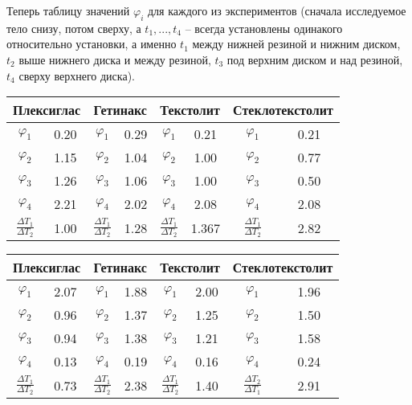 \documentclass[a4paper,11.5pt]{article} %
\begin{document}
Теперь таблицу значений $\varphi_i$ для каждого из экспериментов (сначала исследуемое тело снизу, потом сверху, а $t_1, ... , t_4$ -- всегда установлены одинакого относительно установки, а именно $t_1$ между нижней резиной и нижним диском, $t_2$ выше нижнего диска и между резиной, $t_3$ под верхним диском и над резиной, $t_4$ сверху верхнего диска).

\begin{center}
\begin{tabular}{|c|c|c|c|c|c|c|c|}
\hline 
\multicolumn{2}{|c|}{Плексиглас} & \multicolumn{2}{c|}{Гетинакс} & \multicolumn{2}{c|}{Текстолит} & \multicolumn{2}{c|}{Стеклотекстолит} \\ 
\hline 
$\varphi_1$ & 0.20 & $\varphi_1$ & 0.29 & $\varphi_1$ & 0.21 & $\varphi_1$ & 0.21 \\ 
\hline 
$\varphi_2$ & 1.15 & $\varphi_2$ & 1.04 & $\varphi_2$ & 1.00 & $\varphi_2$ & 0.77 \\ 
\hline 
$\varphi_3$ & 1.26 & $\varphi_3$ & 1.06 & $\varphi_3$ & 1.00 & $\varphi_3$ & 0.50 \\ 
\hline 
$\varphi_4$ & 2.21 & $\varphi_4$ & 2.02 & $\varphi_4$ & 2.08 & $\varphi_4$ & 2.08 \\ 
\hline 
$\frac{\Delta T_1}{\Delta T_2}$ & 1.00 & $\frac{\Delta T_1}{\Delta T_2}$ & 1.28 & $\frac{\Delta T_1}{\Delta T_2}$ & 1.367 & $\frac{\Delta T_1}{\Delta T_2}$ & 2.82 \\
\hline
\end{tabular}
\end{center} 

\begin{center}
\begin{tabular}{|c|c|c|c|c|c|c|c|}
\hline 
\multicolumn{2}{|c|}{Плексиглас} & \multicolumn{2}{c|}{Гетинакс} & \multicolumn{2}{c|}{Текстолит} & \multicolumn{2}{c|}{Стеклотекстолит} \\ 
\hline 
$\varphi_1$ & 2.07 & $\varphi_1$ & 1.88 & $\varphi_1$ & 2.00 & $\varphi_1$ & 1.96 \\ 
\hline 
$\varphi_2$ & 0.96 & $\varphi_2$ & 1.37 & $\varphi_2$ & 1.25 & $\varphi_2$ & 1.50 \\ 
\hline 
$\varphi_3$ & 0.94 & $\varphi_3$ & 1.38 & $\varphi_3$ & 1.21 & $\varphi_3$ & 1.58 \\ 
\hline 
$\varphi_4$ & 0.13 & $\varphi_4$ & 0.19 & $\varphi_4$ & 0.16 & $\varphi_4$ & 0.24 \\ 
\hline 
$\frac{\Delta T_1}{\Delta T_2}$ & 0.73 & $\frac{\Delta T_1}{\Delta T_2}$ & 2.38 & $\frac{\Delta T_1}{\Delta T_2}$ & 1.40 & $\frac{\Delta T_2}{\Delta T_1}$ & 2.91 \\
\hline
\end{tabular}
\end{center}
\end{document}
